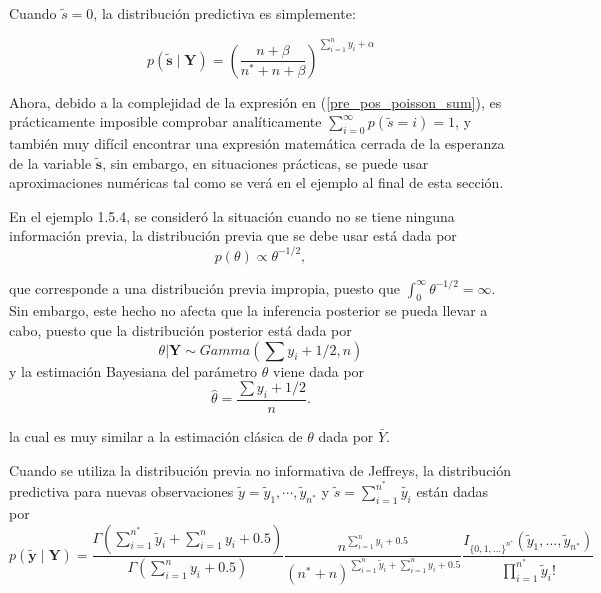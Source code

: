     Cuando $\tilde{s}=0$, la distribuci\'on predictiva es simplemente:
    
    \begin{equation*}
    p(\tilde{\mathbf{s}} \mid \mathbf{Y})=
    \left(\frac{n+\beta}{n^*+n+\beta}\right)^{\sum_{i=1}^ny_i+\alpha}
    \end{equation*}
    
    Ahora, debido a la complejidad de la expresi\'on en (\ref{pre_pos_poisson_sum}), es pr\'acticamente imposible comprobar anal\'iticamente $\sum_{i=0}^\infty p(\tilde{s}=i)=1$, y tambi\'en muy dif\'icil encontrar una expresi\'on matem\'atica cerrada de la esperanza de la variable $\mathbf{\tilde{s}}$, sin embargo, en situaciones pr\'acticas, se puede usar aproximaciones num\'ericas tal como se ver\'a en el ejemplo al final de esta secci\'on.
    
    En el ejemplo 1.5.4, se consider\'o la situaci\'on cuando no se tiene ninguna informaci\'on previa, la distribuci\'on previa que se debe usar est\'a dada por
    \begin{equation*}
    p(\theta)\propto\theta^{-1/2},
    \end{equation*}
    
    que corresponde a una distribuci\'on previa impropia, puesto que $\int_{0}^\infty \theta^{-1/2}=\infty$. Sin embargo, este hecho no afecta que la inferencia posterior se pueda llevar a cabo, puesto que la distribuci\'on posterior est\'a dada por
    \begin{equation*}
    \theta|\mathbf{Y}\sim Gamma(\sum y_i+1/2,n)
    \end{equation*}
    y la estimaci\'on Bayesiana del par\'ametro $\theta$ viene dada por 
    \begin{equation*}
    \hat{\theta}=\frac{\sum y_i+1/2}{n}.
    \end{equation*}
    
    la cual es muy similar a la estimaci\'on cl\'asica de $\theta$ dada por $\bar{Y}$.
    
    Cuando se utiliza la distribuci\'on previa no informativa de Jeffreys, la distribuci\'on predictiva para nuevas observaciones $\tilde{y}={\tilde{y}_1,\cdots,\tilde{y}_{n^*}}$ y $\tilde{s}=\sum_{i=1}^{n^*}\tilde{y_i}$ est\'an dadas por
    \begin{equation}\label{pred_posson_Jeffreys}
    p(\tilde{\mathbf{y}} \mid \mathbf{Y})=\frac{\Gamma(\sum_{i=1}^{n^*}\tilde{y}_i+\sum_{i=1}^ny_i+0.5)}{\Gamma(\sum_{i=1}^ny_i+0.5)}
    \frac{n^{\sum_{i=1}^ny_i+0.5}}{({n^*}+n)^{\sum_{i=1}^n\tilde{y}_i+\sum_{i=1}^ny_i+0.5}}
    \frac{I_{\{0,1,\ldots\}^{n^*}}(\tilde{y}_1,\ldots,\tilde{y}_{n^*})}{\prod_{i=1}^{n^*}\tilde{y}_i!}
    \end{equation}
    
